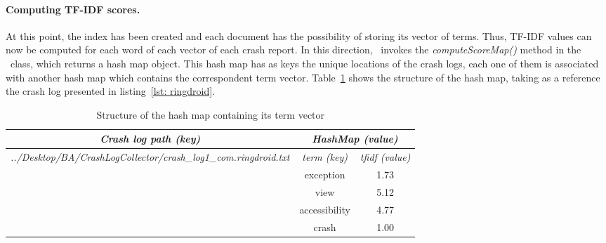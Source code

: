 \paragraph{Computing TF-IDF scores.} 
At this point, the index has been created and each document has the possibility of storing its vector of terms. 
Thus, TF-IDF values can now be computed for each word of each vector of each crash report. 
In this direction, \toolname\ invokes the \textit{computeScoreMap()} method in the \TFIDF\ class, which returns a hash map object. 
This hash map has as keys the unique locations of the crash logs, each one of them is associated with another hash map which contains the correspondent term vector.
Table~\ref{tbl: scoremap} shows the structure of the hash map, taking as a reference the crash log presented in listing~\ref{lst: ringdroid}. 
\begin{table}[tb]
\centering
\caption{Structure of the hash map containing its term vector}
\label{tbl: scoremap}
\begin{tabular}{l|c|c|}
\hline
\multicolumn{1}{|c|}{{\color[HTML]{000000} \textit{\textbf{Crash log path (key)}}}}                                 & \multicolumn{2}{c|}{{\color[HTML]{000000} \textit{\textbf{HashMap (value)}}}} \\ \hline
\multicolumn{1}{|l|}{\textit{../Desktop/BA/CrashLogCollector/crash\_log1\_com.ringdroid.txt}} & {\textit{term (key)}}                   & { \textit{tfidf (value)}}                  \\ \hline
                                                                                                            & \hspace{0.7cm}exception\hspace{0.7cm}                             & \hspace{0.2cm}1.73\hspace{0.2cm}                                      \\ \cline{2-3} 
                                                                                                            & view                               & 5.12                                  \\ \cline{2-3} 
                                                                                                            & accessibility                         & 4.77                                  \\ \cline{2-3} 
                                                                                                            & crash                                 & 1.00                                  \\ \cline{2-3} 

\end{tabular}
\end{table}
